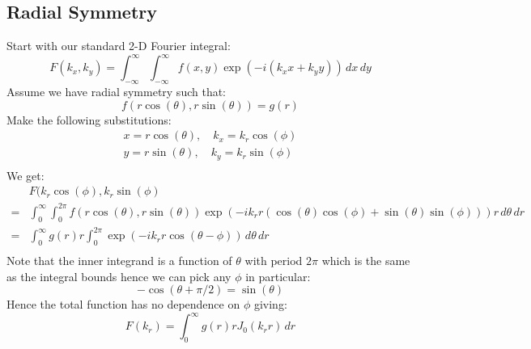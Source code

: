 \subsection{Radial Symmetry}
Start with our standard 2-D Fourier integral:
\[F(k_x,k_y) = \int_{-\infty}^{\infty}\int_{-\infty}^{\infty}f(x,y)\exp(-i(k_x x + k_y y))\,dx\,dy\]
Assume we have radial symmetry such that:
\[f(r\cos(\theta),r\sin(\theta)) = g(r)\]
Make the following substitutions:
\begin{equation*}
\begin{aligned}
	x = r\cos(\theta),\quad k_x = k_r\cos(\phi) \\
	y = r\sin(\theta),\quad k_y = k_r\sin(\phi)\\
\end{aligned}
\end{equation*}
We get:
\begin{equation*}
\begin{aligned}
	&F(k_r\cos(\phi),k_r\sin(\phi)  \\
	=& \int_0^\infty\int_0^{2\pi}f(r\cos(\theta),r\sin(\theta))\exp(-ik_r r(\cos(\theta)\cos(\phi)+\sin(\theta)\sin(\phi)))r\,d\theta\,dr\\
	=& \int_0^\infty g(r)r\int_0^{2\pi}\exp(-ik_r r\cos(\theta-\phi))\,d\theta\,dr \\
\end{aligned}
\end{equation*}
Note that the inner integrand is a function of $\theta$ with period $2\pi$ which is the same as the integral bounds hence we can pick any $\phi$ in particular:
\[-\cos(\theta +\pi/2) = \sin(\theta)\]
Hence the total function has no dependence on $\phi$ giving:
\[F(k_r) = \int_0^\infty g(r)rJ_0(k_r r)\,dr\]

